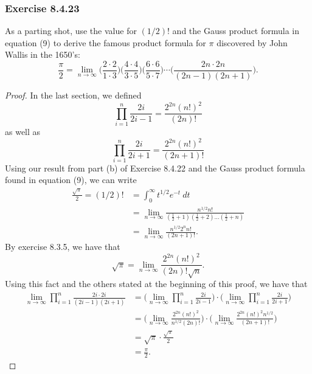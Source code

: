 \subsubsection{Exercise 8.4.23} As a parting shot, use the value for \( (1/2)! \) and the Gauss product formula in equation (9) to derive the famous product formula for \( \pi  \) discovered by John Wallis in the 1650's:
\[ \frac{ \pi  }{  2 } = \lim_{ n \to \infty  } \Big( \frac{ 2 \cdot 2  }{ 1 \cdot 3  }  \Big) \Big( \frac{ 4 \cdot 4  }{ 3 \cdot 5  }  \Big) \Big(  \frac{ 6 \cdot 6  }{ 5 \cdot 7  }  \Big) \dotsb \Big( \frac{ 2n \cdot 2n  }{ (2n-1)(2n+1) }  \Big).\]
\begin{proof}
In the last section, we defined 
\[  \prod_{i=1}^{n} \frac{ 2i }{ 2i-1 } =  \frac{ 2^{2n} (n!)^{2}  }{ (2n)! }   \] as well as 
\[  \prod_{i=1}^{n} \frac{ 2i }{ 2i+1 } =  \frac{ 2^{2n} (n!)^{2}  }{ (2n+1)! }   \]  
Using our result from part (b) of Exercise 8.4.22 and the Gauss product formula found in equation (9), we can write  
\begin{align*}
    \frac{ \sqrt{ \pi }  }{ 2 }  = (1/2)! &= \int_{ 0 }^{ \infty  } t^{1/2} e^{-t} \ dt \\
                                          &= \lim_{ n \to \infty  } \frac{ n^{1/2} n! }{ ( \frac{ 1 }{ 2 } + 1  ) ( \frac{ 1 }{ 2 } + 2  ) \dots ( \frac{ 1 }{ 2 } + n ) }  \\
                                          &= \lim_{ n \to \infty  } \frac{ n^{1/2}  2^{n} n!  }{ (2n+1)! }. 
\end{align*}
By exercise 8.3.5, we have that 
\[  \sqrt{ \pi } = \lim_{ n \to \infty  }  \frac{ 2^{2n} (n!)^{2}  }{ (2n)! \sqrt{ n }  }. \]
Using this fact and the others stated at the beginning of this proof, we have that 
\begin{align*}
    \lim_{ n \to \infty  } \prod_{i=1}^{n} \frac{ 2i \cdot 2i }{ (2i-1)(2i+1) } &= \Big( \lim_{ n \to \infty  }  \prod_{i=1}^{n} \frac{ 2i }{ 2i-1 }  \Big) \cdot \Big( \lim_{ n \to \infty  } \prod_{i=1}^{n} \frac{ 2i }{ 2i+1 }  \Big)\\
                                                                                &= \Big( \lim_{ n \to \infty  } \frac{ 2^{2n} (n!)^{2}  }{ n^{1/2} (2n)!  }    \Big) \cdot \Big( \lim_{ n \to \infty  }  \frac{ 2^{2n} (n!)^{2} n^{1/2} }{ (2n+1)!  }  \Big) \\
                                                                                &= \sqrt{ \pi } \cdot \frac{ \sqrt{ \pi }  }{ 2 }  \\
                                                                                &= \frac{ \pi }{ 2 }. 
\end{align*}
\end{proof}
















